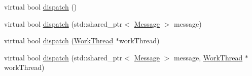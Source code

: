 \begin{DoxyCompactItemize}
virtual bool \hyperlink{classcom_1_1ygomi_1_1roaddb_1_1util_1_1AbstractDispatcher_adc2d0d54275c6f51c771d2fc78cf51fa}{dispatch} ()
\item 
virtual bool \hyperlink{classcom_1_1ygomi_1_1roaddb_1_1util_1_1AbstractDispatcher_aeabd34c4dbb632d31f300dc1ef653a4e}{dispatch} (std\-::shared\-\_\-ptr$<$ \hyperlink{classcom_1_1ygomi_1_1roaddb_1_1util_1_1Message}{Message} $>$ message)
\item 
virtual bool \hyperlink{classcom_1_1ygomi_1_1roaddb_1_1util_1_1AbstractDispatcher_a47e090db520b77c4badb1d47c71ee363}{dispatch} (\hyperlink{classcom_1_1ygomi_1_1roaddb_1_1util_1_1WorkThread}{Work\-Thread} $\ast$work\-Thread)
\item 
virtual bool \hyperlink{classcom_1_1ygomi_1_1roaddb_1_1util_1_1AbstractDispatcher_aea9ddca991bc4ff32d626d85738a794d}{dispatch} (std\-::shared\-\_\-ptr$<$ \hyperlink{classcom_1_1ygomi_1_1roaddb_1_1util_1_1Message}{Message} $>$ message, \hyperlink{classcom_1_1ygomi_1_1roaddb_1_1util_1_1WorkThread}{Work\-Thread} $\ast$work\-Thread)
\end{DoxyCompactItemize}


